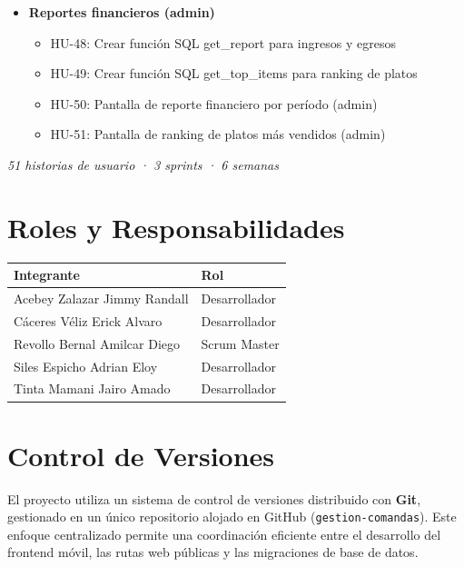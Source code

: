 \begin{itemize}[leftmargin=1.5em]
\item \textbf{Reportes financieros (admin)}

\begin{itemize}
\item HU-48: Crear función SQL get\_report para ingresos y egresos
\item HU-49: Crear función SQL get\_top\_items para ranking de platos
\item HU-50: Pantalla de reporte financiero por período (admin)
\item HU-51: Pantalla de ranking de platos más vendidos (admin)
\end{itemize}

\end{itemize}

\bigskip
\begin{center}
\textit{51 historias de usuario · 3 sprints · 6 semanas}
\end{center}


\section{Roles y Responsabilidades}

\begin{center}
\begin{tabular}{ll}
  \toprule
  \textbf{Integrante} & \textbf{Rol} \\
  \midrule
  Acebey Zalazar Jimmy Randall & Desarrollador \\
  Cáceres Véliz Erick Alvaro   & Desarrollador \\
  Revollo Bernal Amilcar Diego & Scrum Master \\
  Siles Espicho Adrian Eloy    & Desarrollador  \\
  Tinta Mamani Jairo Amado     & Desarrollador \\
  \bottomrule
\end{tabular}
\end{center}


\section{Control de Versiones}

El proyecto utiliza un sistema de control de versiones distribuido con
\textbf{Git}, gestionado en un único repositorio alojado en GitHub
(\texttt{gestion-comandas}). Este enfoque centralizado permite una
coordinación eficiente entre el desarrollo del frontend móvil, las rutas
web públicas y las migraciones de base de datos.

